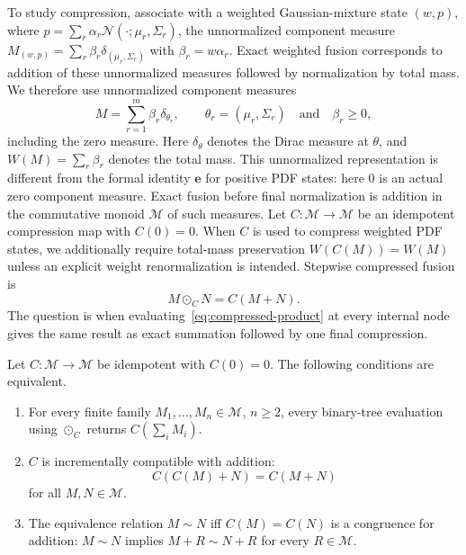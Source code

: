\documentclass[runningheads]{llncs}
\newcommand{\e}{\mathbf{e}}
\newcommand{\N}{\mathcal{N}}
\begin{document}
To study compression, associate with a weighted Gaussian-mixture state $(w,p)$, where $p=\sum_r\alpha_r\N(\cdot;\mu_r,\Sigma_r)$, the unnormalized component measure $M_{(w,p)}=\sum_r\beta_r\delta_{(\mu_r,\Sigma_r)}$ with $\beta_r=w\alpha_r$. Exact weighted fusion corresponds to addition of these unnormalized measures followed by normalization by total mass. We therefore use unnormalized component measures 
\begin{equation}
  M=\sum_{r=1}^m \beta_r\delta_{\theta_r},
  \qquad
  \theta_r=(\mu_r,\Sigma_r)
  \quad\text{and}\quad
  \beta_r\geq0,
  \label{eq:component-measure}
\end{equation}
including the zero measure. Here $\delta_\theta$ denotes the Dirac measure at $\theta$, and $W(M)=\sum_r\beta_r$ denotes the total mass. This unnormalized representation is different from the formal identity $\e$ for positive PDF states: here $0$ is an actual zero component measure. Exact fusion before final normalization is addition in the commutative monoid $\mathcal M$ of such measures. Let $C:\mathcal M\to\mathcal M$ be an idempotent compression map with $C(0)=0$. When $C$ is used to compress weighted PDF states, we additionally require total-mass preservation $W(C(M))=W(M)$ unless an explicit weight renormalization is intended. Stepwise compressed fusion is
\begin{equation}
  M\odot_C N=C(M+N).
  \label{eq:compressed-product}
\end{equation}
The question is when evaluating~\eqref{eq:compressed-product} at every internal node gives the same result as exact summation followed by one final compression.

\begin{theorem}\label{thm:compression-congruence}
Let $C:\mathcal M\to\mathcal M$ be idempotent with $C(0)=0$. The following
conditions are equivalent.
\begin{enumerate}
  \item For every finite family $M_1,\ldots,M_n\in\mathcal M$, $n\geq2$,
  every binary-tree evaluation using $\odot_C$ returns
  $C(\sum_i M_i)$.

  \item $C$ is incrementally compatible with addition:
  \begin{equation}
    C(C(M)+N)=C(M+N)
    \label{eq:incremental-compatibility}
  \end{equation}
  for all $M,N\in\mathcal M$.

  \item The equivalence relation $M\sim N$ iff $C(M)=C(N)$ is a congruence
  for addition: $M\sim N$ implies $M+R\sim N+R$ for every $R\in\mathcal M$.
\end{enumerate}
\end{theorem}
\end{document}
